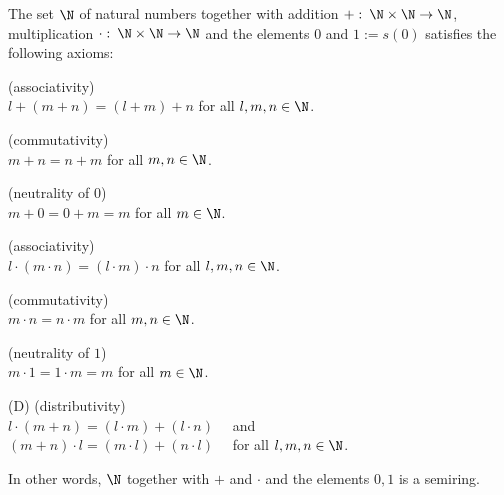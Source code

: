 \begin{theorem}
  The set $\N$ of natural numbers together with addition $+ : \: \N  \times \N \to \N$,
  multiplication $\cdot : \: \N  \times \N \to \N$ and the 
  elements $0$ and $1 := s(0) $ satisfies the following axioms: 
  \begin{axiomlist}[A]
  \item \textup{\sffamily (associativity)}\\
    $ l + (m + n) = (l+m) +n$ for all $l,m,n \in \N$. 
  \item \textup{\sffamily (commutativity)}\\
     $ m + n = n+m$ for all $m,n \in \N$. 
  \item \textup{\sffamily (neutrality of $0$)}\\ 
     $m +0 = 0 +m = m$ for all $m\in \N$. 
  \end{axiomlist} 
  \begin{axiomlist}[M]
  \item \textup{\sffamily (associativity)}\\
    $ l \cdot (m \cdot n) = (l\cdot m) \cdot n$ for all $l,m,n \in \N$. 
  \item \textup{\sffamily (commutativity)}\\
     $ m \cdot n = n\cdot m$ for all $m,n \in \N$. 
  \item \textup{\sffamily (neutrality of $1$)}\\ 
     $m \cdot 1 = 1 \cdot m = m$ for all $m\in \N$. 
  \end{axiomlist} 
  \begin{axiomlist}[D]
  \item[\textup{\sffamily (D) }] \textup{\sffamily (distributivity)}\\ 
       $ l \cdot (m +n ) = (l \cdot m) + (l \cdot n) \quad $ and \\
    $ (m +n ) \cdot l = (m \cdot  l) +  (n \cdot l) \quad $ for all $l,m,n\in \N$.
  \end{axiomlist} 
  In other words, $\N$ together with $+$ and $\cdot$ and the elements $0,1$ is a semiring.  
\end{theorem}



